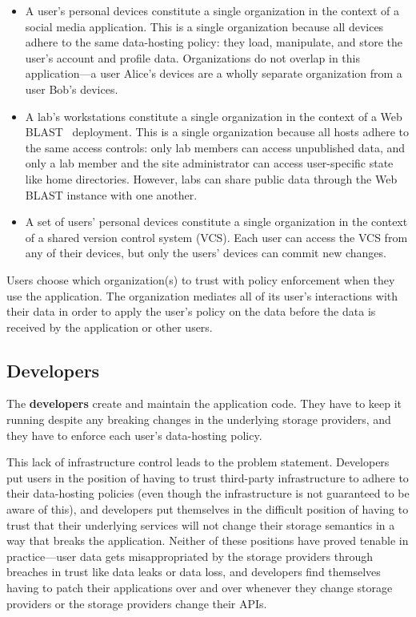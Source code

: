 \begin{itemize}
   \item A user's personal devices constitute a single organization in the context of a
      social media application.  This is a single organization because all
      devices adhere to the same data-hosting policy:  they load, manipulate,
      and store the user's account and profile data.  Organizations do not
      overlap in this application---a user Alice's devices are a wholly
      separate organization from a user Bob's devices.
   \item A lab's workstations constitute a single organization in the context of
      a Web BLAST~\cite{web-blast} deployment.  This is a single organization
      because all hosts adhere to the same access controls:  only lab members
      can access unpublished data, and only a lab member and the site
      administrator can access user-specific state like home directories.
      However, labs can share public data through the Web BLAST instance with
      one another.
   \item A set of users' personal devices constitute a single organization in
      the context of a shared version control system (VCS).  Each user can access the
      VCS from any of their devices, but only the users' devices can commit new
      changes.
\end{itemize}

Users choose which organization(s) to trust with policy enforcement when they
use the application.  The organization mediates all of its user's interactions
with their data in order to apply the user's policy on the data before the data
is received by the application or other users.

\subsection{Developers}

The \textbf{developers} create and maintain the application code.  They have to
keep it running despite any breaking changes in the underlying storage
providers, and they have to enforce each user's data-hosting policy.

This lack of infrastructure control leads to the problem statement.  Developers
put users in the position of having to trust third-party infrastructure
to adhere to their data-hosting policies (even though the infrastructure is not
guaranteed to be aware of this), and developers put themselves in the difficult
position of having to trust that their underlying services will not change their
storage semantics in a way that breaks the application.  Neither of these
positions have proved tenable in practice---user data gets misappropriated by the storage
providers through breaches in trust like data leaks or data loss, and developers
find themselves having to patch their applications over and over whenever they
change storage providers or the storage providers change their APIs.

